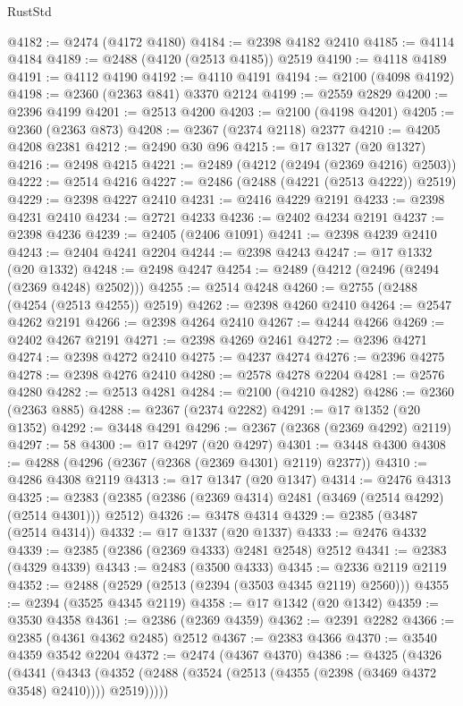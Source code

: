\begin{lexlean}{RustStd}
\begin{coremodule}
{\begin{coremodule}
{{{{{{{{{{{{{{{{{{{{{{{{{{{{{{{{{{{{{{{{{{{{{{{{{{@4182 := @2474 (@4172 @4180)
@4184 := @2398 @4182 @2410
@4185 := @4114 @4184
@4189 := @2488 (@4120 (@2513 @4185)) @2519
@4190 := @4118 @4189
@4191 := @4112 @4190
@4192 := @4110 @4191
@4194 := @2100 (@4098 @4192)
@4198 := @2360 (@2363 @841) @3370 @2124
@4199 := @2559 @2829
@4200 := @2396 @4199
@4201 := @2513 @4200
@4203 := @2100 (@4198 @4201)
@4205 := @2360 (@2363 @873)
@4208 := @2367 (@2374 @2118) @2377
@4210 := @4205 @4208 @2381
@4212 := @2490 @30 @96
@4215 := @17 @1327 (@20 @1327)
@4216 := @2498 @4215
@4221 := @2489 (@4212 (@2494 (@2369 @4216) @2503))
@4222 := @2514 @4216
@4227 := @2486 (@2488 (@4221 (@2513 @4222)) @2519)
@4229 := @2398 @4227 @2410
@4231 := @2416 @4229 @2191
@4233 := @2398 @4231 @2410
@4234 := @2721 @4233
@4236 := @2402 @4234 @2191
@4237 := @2398 @4236
@4239 := @2405 (@2406 @1091)
@4241 := @2398 @4239 @2410
@4243 := @2404 @4241 @2204
@4244 := @2398 @4243
@4247 := @17 @1332 (@20 @1332)
@4248 := @2498 @4247
@4254 := @2489 (@4212 (@2496 (@2494 (@2369 @4248) @2502)))
@4255 := @2514 @4248
@4260 := @2755 (@2488 (@4254 (@2513 @4255)) @2519)
@4262 := @2398 @4260 @2410
@4264 := @2547 @4262 @2191
@4266 := @2398 @4264 @2410
@4267 := @4244 @4266
@4269 := @2402 @4267 @2191
@4271 := @2398 @4269 @2461
@4272 := @2396 @4271
@4274 := @2398 @4272 @2410
@4275 := @4237 @4274
@4276 := @2396 @4275
@4278 := @2398 @4276 @2410
@4280 := @2578 @4278 @2204
@4281 := @2576 @4280
@4282 := @2513 @4281
@4284 := @2100 (@4210 @4282)
@4286 := @2360 (@2363 @885)
@4288 := @2367 (@2374 @2282)
@4291 := @17 @1352 (@20 @1352)
@4292 := @3448 @4291
@4296 := @2367 (@2368 (@2369 @4292) @2119)
@4297 := 58
@4300 := @17 @4297 (@20 @4297)
@4301 := @3448 @4300
@4308 := @4288 (@4296 (@2367 (@2368 (@2369 @4301) @2119) @2377))
@4310 := @4286 @4308 @2119
@4313 := @17 @1347 (@20 @1347)
@4314 := @2476 @4313
@4325 := @2383 (@2385 (@2386 (@2369 @4314) @2481 (@3469 (@2514 @4292) (@2514 @4301))) @2512)
@4326 := @3478 @4314
@4329 := @2385 (@3487 (@2514 @4314))
@4332 := @17 @1337 (@20 @1337)
@4333 := @2476 @4332
@4339 := @2385 (@2386 (@2369 @4333) @2481 @2548) @2512
@4341 := @2383 (@4329 @4339)
@4343 := @2483 (@3500 @4333)
@4345 := @2336 @2119 @2119
@4352 := @2488 (@2529 (@2513 (@2394 (@3503 @4345 @2119) @2560)))
@4355 := @2394 (@3525 @4345 @2119)
@4358 := @17 @1342 (@20 @1342)
@4359 := @3530 @4358
@4361 := @2386 (@2369 @4359)
@4362 := @2391 @2282
@4366 := @2385 (@4361 @4362 @2485) @2512
@4367 := @2383 @4366
@4370 := @3540 @4359 @3542 @2204
@4372 := @2474 (@4367 @4370)
@4386 := @4325
    (@4326
      (@4341
        (@4343 (@4352 (@2488 (@3524 (@2513 (@4355 (@2398 (@3469 @4372 @3548) @2410)))) @2519)))))
}}}}}}}}}}}}}}}}}}}}}}}}}}}}}}}}}}}}}}}}}}}}}}}}}}
\end{coremodule}}
\end{coremodule}
\end{lexlean}
